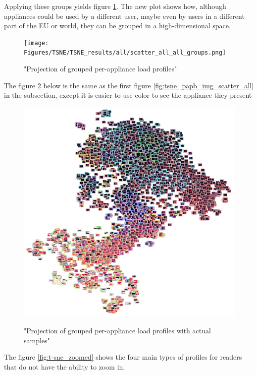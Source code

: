 Applying these groups yields figure \ref{fig:tsne_papb_scatter_all_groups}.
The new plot shows how, although appliances could be used by a different
user, maybe even by users in a different part of the EU or world,
they can be grouped in a high-dimensional space. 

\begin{figure}[H]
	\centering
	\caption{"Projection of grouped per-appliance load profiles"}
	\texttt{[image: Figures/TSNE/TSNE\_results/all/scatter\_all\_all\_groups.png]}
	\label{fig:tsne_papb_scatter_all_groups}
\end{figure}

The figure \ref{fig:tsne_papb_img_scatter_all_groups} below is the same as the first figure \ref{fig:tsne_papb_img_scatter_all} in the subsection,
except it is easier to use color to see the appliance they present

\begin{figure}[H]
	\centering
	\caption{"Projection of grouped per-appliance load profiles with actual samples"}
	\includegraphics[width=.9\textwidth]{Figures/TSNE/TSNE_results/all/img_scatter_all_all_groups.png}
	\label{fig:tsne_papb_img_scatter_all_groups}
\end{figure}

The figure \ref{fig:t-sne_zoomed} shows the four main types of profiles for readers that do not have the ability to zoom in.

